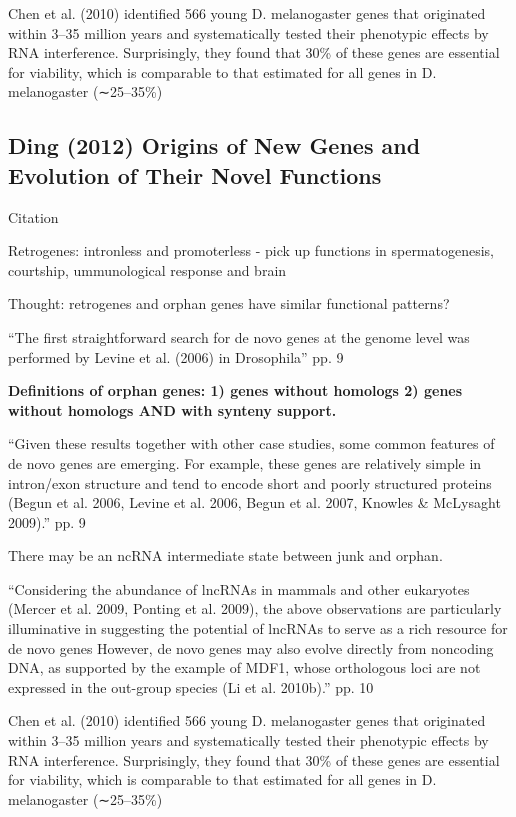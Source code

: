     Chen et al. (2010) identified 566 young D. melanogaster genes that
    originated within 3–35 million years and systematically tested their
    phenotypic effects by RNA interference. Surprisingly, they found that
    30\% of these genes are essential for viability, which is comparable to
    that estimated for all genes in D. melanogaster (∼25–35\%)

\subsection{Ding (2012) Origins of New Genes and Evolution of Their Novel
Functions}

    Citation \cite{ding_origins_2012}
    
    Retrogenes: intronless and promoterless - pick up functions in
    spermatogenesis, courtship, ummunological response and brain

    Thought: retrogenes and orphan genes have similar functional patterns?

    ``The first straightforward search for de novo genes at the genome
    level was performed by Levine et al. (2006) in Drosophila'' pp. 9

    \textbf{Definitions of orphan genes: 1) genes without homologs 2) genes
    without homologs AND with synteny support.}

    ``Given these results together with other case studies, some common
    features of de novo genes are emerging. For example, these genes are
    relatively simple in intron/exon structure and tend to encode short and
    poorly structured proteins (Begun et al. 2006, Levine et al. 2006,
    Begun et al. 2007, Knowles \& McLysaght 2009).'' pp. 9

    There may be an ncRNA intermediate state between junk and orphan.

    ``Considering the abundance of lncRNAs in mammals and other eukaryotes
    (Mercer et al. 2009, Ponting et al. 2009), the above observations are
    particularly illuminative in suggesting the potential of lncRNAs to
    serve as a rich resource for de novo genes However, de novo genes may
    also evolve directly from noncoding DNA, as supported by the example of
    MDF1, whose orthologous loci are not expressed in the out-group species
    (Li et al. 2010b).'' pp. 10


    Chen et al. (2010) identified 566 young D. melanogaster genes that
    originated within 3–35 million years and systematically tested their
    phenotypic effects by RNA interference. Surprisingly, they found that
    30\% of these genes are essential for viability, which is comparable to
    that estimated for all genes in D. melanogaster (∼25–35\%)

